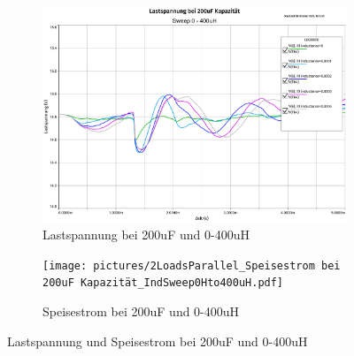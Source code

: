 \begin{figure}[H]
	\centering
	\begin{subfigure}{/13}
		\centering
		\includegraphics[width=\textwidth]{pictures/2LoadsParallel_Lastspannung bei 200uF_IndSweep0Hto400uH.pdf}
		\caption{Lastspannung bei 200uF und 0-400uH}
		\label{pic:loadvoltage_200uF}
	\end{subfigure}
	\hfill
	\begin{subfigure}{/13}
		\centering
		\texttt{[image: pictures/2LoadsParallel\_Speisestrom bei 200uF Kapazität\_IndSweep0Hto400uH.pdf]}
		\caption{Speisestrom bei 200uF und 0-400uH}
		\label{pic:supplycurrent_200uF}
	\end{subfigure}
	\caption{Lastspannung und Speisestrom bei 200uF und 0-400uH}
	\label{pic:supplycurrent_loadvoltage_200uF}
\end{figure}
